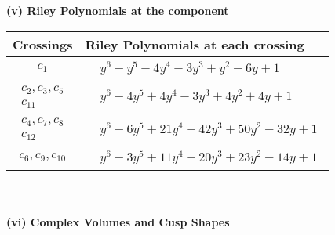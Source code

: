 \documentclass[1p]{elsarticle_modified}
\theoremstyle{definition}
\begin{document}
\flushleft \textbf{(v) Riley Polynomials at the component}\newline \\
\begin{tabular}{m{50pt}|m{274pt}}
Crossings & \hspace{64pt}Riley Polynomials at each crossing \\
\hline $$\begin{aligned}c_{1}\end{aligned}$$&$\begin{aligned}
&y^6- y^5-4 y^4-3 y^3+y^2-6 y+1
\end{aligned}$\\
\hline $$\begin{aligned}c_{2},c_{3},c_{5}\\c_{11}\end{aligned}$$&$\begin{aligned}
&y^6-4 y^5+4 y^4-3 y^3+4 y^2+4 y+1
\end{aligned}$\\
\hline $$\begin{aligned}c_{4},c_{7},c_{8}\\c_{12}\end{aligned}$$&$\begin{aligned}
&y^6-6 y^5+21 y^4-42 y^3+50 y^2-32 y+1
\end{aligned}$\\
\hline $$\begin{aligned}c_{6},c_{9},c_{10}\end{aligned}$$&$\begin{aligned}
&y^6-3 y^5+11 y^4-20 y^3+23 y^2-14 y+1
\end{aligned}$\\
\hline
\end{tabular}\\~\\
\newpage\flushleft \textbf{(vi) Complex Volumes and Cusp Shapes}
\end{document}
